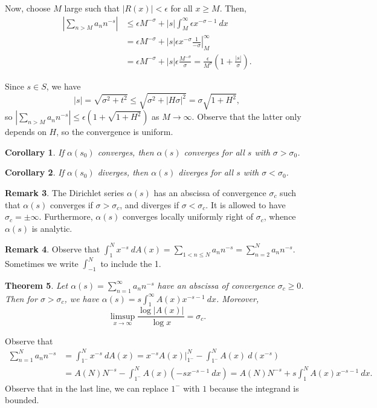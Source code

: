 \documentclass[11pt]{article}
\newtheorem{thm}{Theorem}[section]
\newtheorem{cor}[thm]{Corollary}
\theoremstyle{definition}
\newtheorem{remark}[thm]{Remark}
\newcommand{\s}[0]{\sigma}
\newcommand{\abs}[1]{\left\lvert#1\right\rvert} %
\begin{document}
Now, choose $M$ large such that $\abs{R(x)}<\epsilon$ for all $x\ge M$. Then,
\begin{align*}
  \abs{\sum_{n>M}a_nn^{-s}}
  &\le \epsilon M^{-\sigma} + \abs{s}\int_M^\infty \epsilon x^{-\sigma-1} ~dx \\
  &= \epsilon M^{-\s} + \left.\abs{s}\epsilon x^{-\s} \frac1{-\s} \right|_M^\infty \\
  &= \epsilon M^{-\s} + \abs{s} \epsilon \frac{M^{-\s}}{\s}
  = \frac{\epsilon}{M^\s} \left(1 + \frac{\abs{s}}{\s}\right) .
\end{align*}

Since $s\in S$, we have
\[
  \abs{s} = \sqrt{\s^2+t^2} \le \sqrt{\s^2 + \abs{H\s}^2} = \s\sqrt{1+H^2} ,
\]
so $\abs{\sum_{n>M}a_nn^{-s}} \le \epsilon(1+\sqrt{1+H^2})$ as $M\to\infty$. Observe that
the latter only depends on $H$, so the convergence is uniform.
\qedhere

\begin{cor}
If $\alpha(s_0)$ converges, then $\alpha(s)$ converges for all $s$ with $\sigma>\sigma_0$.
\end{cor}

\begin{cor}
If $\alpha(s_0)$ diverges, then $\alpha(s)$ diverges for all $s$ with $\sigma<\sigma_0$.
\end{cor}

\begin{remark}
The Dirichlet series $\alpha(s)$ has an abscissa of convergence $\sigma_c$ such that
$\alpha(s)$ converges if $\sigma>\sigma_c$, and diverges if $\sigma<\sigma_c$. It is
allowed to have $\sigma_c=\pm\infty$. Furthermore, $\alpha(s)$ converges locally uniformly
right of $\sigma_c$, whence $\alpha(s)$ is analytic.
\end{remark}

\begin{remark}
Observe that $\int_1^N x^{-s} ~dA(x) = \sum_{1<n\le N}a_nn^{-s} = \sum_{n=2}^Na_nn^{-s}$.
Sometimes we write $\int_{-1}^N$ to include the 1.
\end{remark}

\begin{thm}
Let $\alpha(s)=\sum_{n=1}^\infty a_nn^{-s}$ have an abscissa of convergence $\s_c\ge0$.
Then for $\s>\s_c$, we have $\alpha(s)=s\int_1^\infty A(x)x^{-s-1} ~dx$.
Moreover,
\[
  \limsup_{x\to\infty} \frac{\log\abs{A(x)}}{\log x} = \s_c .
\]
\end{thm}

\proof
Observe that
\begin{align*}
  \sum_{n=1}^N a_nn^{-s} &= \int_{1^-}^N x^{-s} ~dA(x)
  = \left.x^{-s}A(x)\right|_{1^-}^N - \int_{1^-}^N A(x) ~d(x^{-s}) \\
  &= A(N)N^{-s} - \int_{1^-}^N A(x)(-sx^{-s-1} ~dx)
  = A(N)N^{-s} + s\int_1^N A(x) x^{-s-1} ~dx .
\end{align*}
Observe that in the last line, we can replace $1^-$ with $1$ because the integrand is
bounded.
\end{document}
